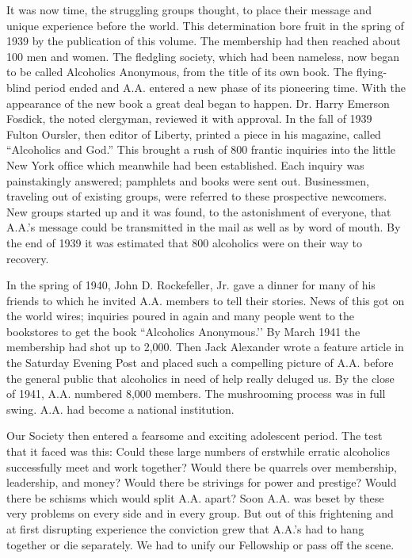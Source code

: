 It was now time, the struggling groups thought, to place their message and unique experience before the
world. 
This determination bore fruit in the spring of 1939 by the publication of this volume. 
The membership had then reached about 100 men and women. 
The fledgling society, which had been nameless, now began to be called Alcoholics Anonymous, from the title of its own book. 
The flying-blind period ended and A.A. entered a new phase of its pioneering time.
With the appearance of the new book a great deal began to happen. Dr. Harry Emerson Fosdick, the
noted clergyman, reviewed it with approval. 
In the fall of 1939 Fulton Oursler, then editor of Liberty, printed a piece in his magazine, called “Alcoholics and God.” 
This brought a rush of 800 frantic inquiries into the little New York ofﬁce which meanwhile had
been established. 
Each inquiry was painstakingly answered; 
pamphlets and books were sent out. 
Businessmen, traveling out of existing groups, were referred to these prospective newcomers. 
New groups started up and it was found, to the astonishment of everyone, that A.A.’s message could be transmitted in the mail as well as by word of mouth. 
By the end of 1939 it was estimated that 800 alcoholics were on their way to recovery.

In the spring of 1940, John D. Rockefeller, Jr. gave a dinner for many of his friends to which he invited A.A. members to tell their stories. 
News of this got on the world wires; 
inquiries poured in again and many people went to the bookstores to get the book “Alcoholics Anonymous.’’ 
By March 1941 the membership had shot up to 2,000. 
Then Jack Alexander wrote a feature article in the Saturday Evening Post and placed such a compelling picture of A.A. before the general public that alcoholics in need of help really deluged us. 
By the close of 1941, A.A. numbered 8,000 members. 
The mushrooming process was in full swing.
A.A. had become a national institution.

Our Society then entered a fearsome and exciting adolescent period. 
The test that it faced was this:
Could these large numbers of erstwhile erratic alcoholics successfully meet and work together? 
Would there be quarrels over membership, leadership, and money? 
Would there be strivings for power and
prestige? 
Would there be schisms which would split A.A. apart? 
Soon A.A. was beset by these very problems on every side and in every group. 
But out of this frightening and at first disrupting experience the conviction grew that A.A.’s had to hang together or die separately. 
We had to unify our Fellowship or pass off the scene.

